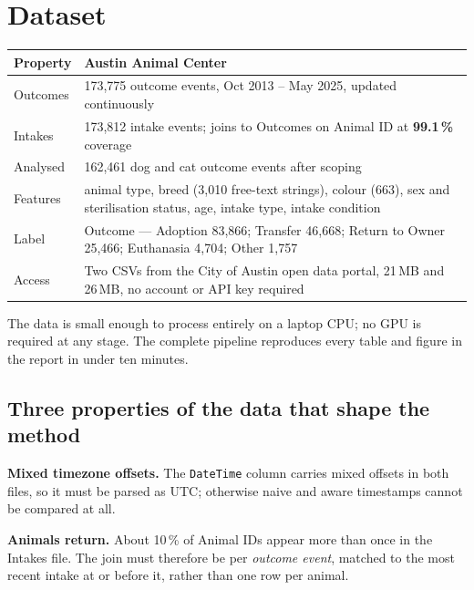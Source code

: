 \documentclass[11pt,a4paper]{article}
\begin{document}
\section*{Dataset}

\begin{center}
\begin{tabular}{@{}L{3.1cm}L{12.2cm}@{}}
\toprule
\textbf{Property} & \textbf{Austin Animal Center} \\
\midrule
Outcomes & 173{,}775 outcome events, Oct 2013 -- May 2025, updated continuously \\
Intakes & 173{,}812 intake events; joins to Outcomes on Animal ID at
\textbf{99.1\,\%} coverage \\
Analysed & 162{,}461 dog and cat outcome events after scoping \\
Features & animal type, breed (3{,}010 free-text strings), colour (663), sex and
sterilisation status, age, intake type, intake condition \\
Label & Outcome --- Adoption 83{,}866; Transfer 46{,}668; Return to Owner
25{,}466; Euthanasia 4{,}704; Other 1{,}757 \\
Access & Two CSVs from the City of Austin open data portal, 21\,MB and 26\,MB,
no account or API key required \\
\bottomrule
\end{tabular}
\end{center}

\vspace{4pt}
The data is small enough to process entirely on a laptop CPU; no GPU is required at
any stage. The complete pipeline reproduces every table and figure in the report in
under ten minutes.

\subsection*{Three properties of the data that shape the method}

\textbf{Mixed timezone offsets.} The \texttt{DateTime} column carries mixed offsets
in both files, so it must be parsed as UTC; otherwise naive and aware timestamps
cannot be compared at all.

\textbf{Animals return.} About 10\,\% of Animal IDs appear more than once in the
Intakes file. The join must therefore be per \emph{outcome event}, matched to the
most recent intake at or before it, rather than one row per animal.
\end{document}
